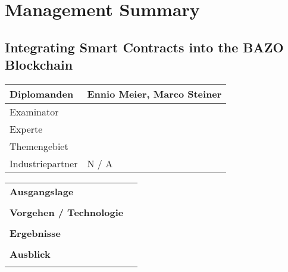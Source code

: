 \chapter*{Management Summary}
\thispagestyle{main} %

\section*{Integrating Smart Contracts into the BAZO Blockchain}

\begin{tabular}[t]{ | p{3cm} | p{12.5cm} |}
\hline
Diplomanden & 
Ennio Meier, Marco Steiner \\ \hline

Examinator & 
\\ \hline

Experte & 
\\ \hline

Themengebiet & 
\\ \hline

Industriepartner & 
N / A \\ \hline

\end{tabular}

\begin{tabular}[t]{ p{3cm} p{12.5cm}}
\textbf{Ausgangslage} & 
\\ \\

\raggedright
\textbf{Vorgehen / Technologie} & 
\\ \\

\raggedright
\textbf{Ergebnisse} & 
\\ \\

\textbf{Ausblick} &
\\ \\
\end{tabular}
